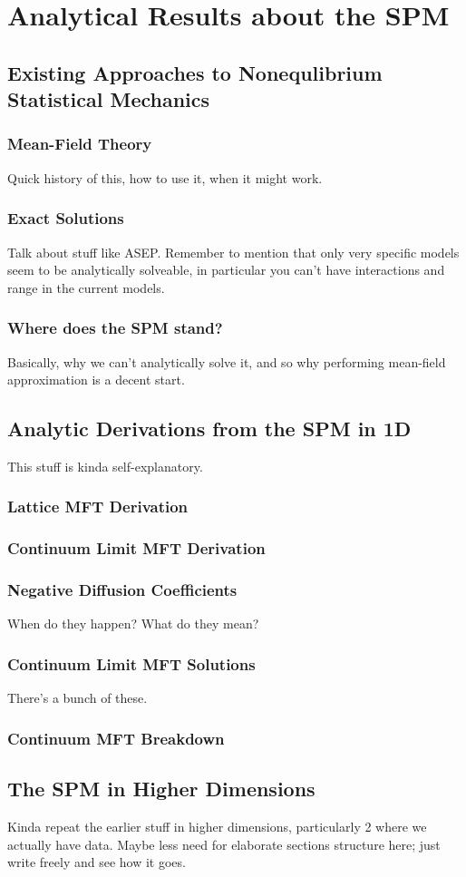 \chapter{Analytical Results about the SPM}

\section{Existing Approaches to Nonequlibrium Statistical Mechanics}
\subsection{Mean-Field Theory}
Quick history of this, how to use it, when it might work.
\subsection{Exact Solutions}
Talk about stuff like ASEP. Remember to mention that only very specific models seem to be analytically solveable, in particular you can't have interactions and range in the current models.
\subsection{Where does the SPM stand?}
Basically, why we can't analytically solve it, and so why performing mean-field approximation is a decent start.

\section{Analytic Derivations from the SPM in 1D}
This stuff is kinda self-explanatory.
\subsection{Lattice MFT Derivation}
\subsection{Continuum Limit MFT Derivation}
\subsection{Negative Diffusion Coefficients}
When do they happen? What do they mean?
\subsection{Continuum Limit MFT Solutions}
There's a bunch of these.
\subsection{Continuum MFT Breakdown}

\section{The SPM in Higher Dimensions}
Kinda repeat the earlier stuff in higher dimensions, particularly 2 where we actually have data. Maybe less need for elaborate sections structure here; just write freely and see how it goes.

